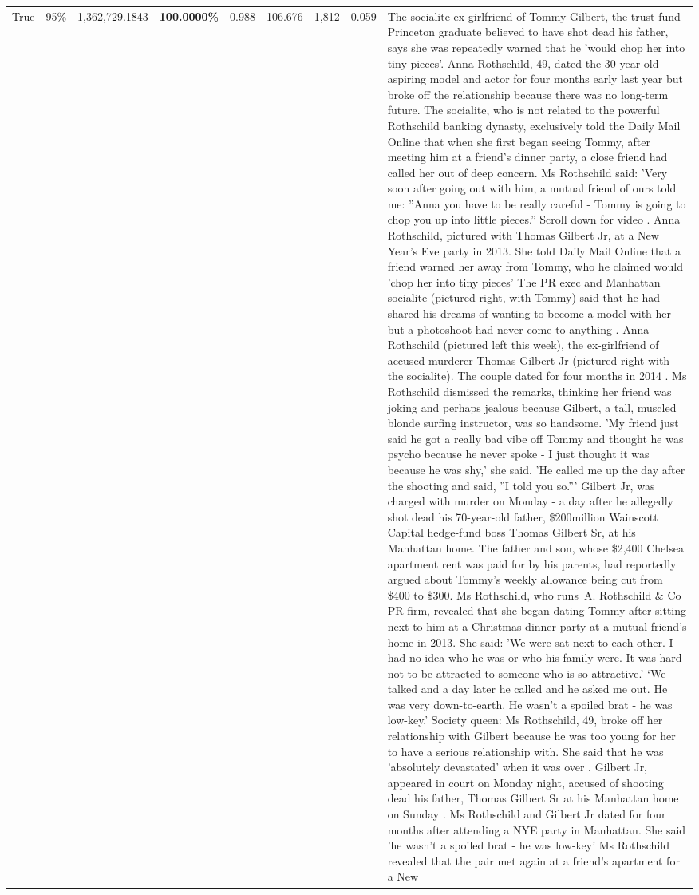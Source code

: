 \begin{table}[H]
\begin{tabular}{lllrlllll}
True & 95\% & 1,362,729.1843 & \bfseries \color{red} 100.0000\% & 0.988 & 106.676 & 1,812 & 0.059 & The socialite ex-girlfriend of Tommy Gilbert, the trust-fund Princeton graduate believed to have shot dead his father, says she was repeatedly warned that he 'would chop her into tiny pieces'. Anna Rothschild, 49, dated the 30-year-old aspiring model and actor for four months early last year but broke off the relationship because there was no long-term future. The socialite, who is not related to the powerful Rothschild banking dynasty, exclusively told the Daily Mail Online that when she first began seeing Tommy, after meeting him at a friend's dinner party, a close friend had called her out of deep concern. Ms Rothschild said: 'Very soon after going out with him, a mutual friend of ours told me: ''Anna you have to be really careful - Tommy is going to chop you up into little pieces.'' Scroll down for video . Anna Rothschild, pictured with Thomas Gilbert Jr, at a New Year's Eve party in 2013. She told Daily Mail Online that a friend warned her away from Tommy, who he claimed would 'chop her into tiny pieces' The PR exec and Manhattan socialite (pictured right, with Tommy) said that he had shared his dreams of wanting to become a model with her but a photoshoot had never come to anything . Anna Rothschild (pictured left this week), the ex-girlfriend of accused murderer Thomas Gilbert Jr (pictured right with the socialite). The couple dated for four months in 2014 . Ms Rothschild dismissed the remarks, thinking her friend was joking and perhaps jealous because Gilbert, a tall, muscled blonde surfing instructor, was so handsome. 'My friend just said he got a really bad vibe off Tommy and thought he was psycho because he never spoke - I just thought it was because he was shy,' she said. 'He called me up the day after the shooting and said, ''I told you so.''' Gilbert Jr, was charged with murder on Monday - a day after he allegedly shot dead his 70-year-old father, \$200million Wainscott Capital hedge-fund boss Thomas Gilbert Sr, at his Manhattan home. The father and son, whose \$2,400 Chelsea apartment rent was paid for by his parents, had reportedly argued about Tommy's weekly allowance being cut from \$400 to \$300. Ms Rothschild, who runs A. Rothschild \& Co PR firm, revealed that she began dating Tommy after sitting next to him at a Christmas dinner party at a mutual friend's home in 2013. She said: 'We were sat next to each other. I had no idea who he was or who his family were. It was hard not to be attracted to someone who is so attractive.' ‘We talked and a day later he called and he asked me out. He was very down-to-earth. He wasn’t a spoiled brat - he was low-key.’ Society queen: Ms Rothschild, 49, broke off her relationship with Gilbert because he was too young for her to have a serious relationship with. She said that he was 'absolutely devastated' when it was over . Gilbert Jr, appeared in court on Monday night, accused of shooting dead his father, Thomas Gilbert Sr at his Manhattan home on Sunday . Ms Rothschild and Gilbert Jr dated for four months after attending a NYE party in Manhattan. She said 'he wasn't a spoiled brat - he was low-key' Ms Rothschild revealed that the pair met again at a friend’s apartment for a New 
\end{tabular}
\end{table}
